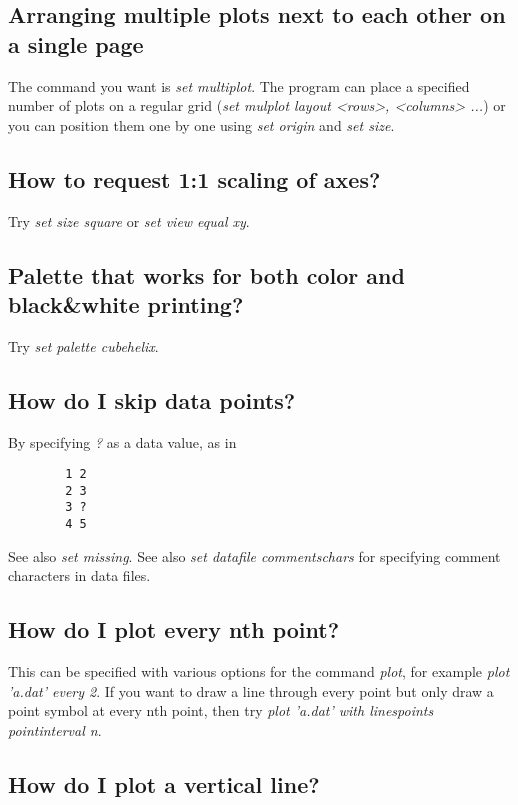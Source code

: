 \documentclass[letter,11pt]{article}
\begin{document}
{\subsection{Arranging multiple plots next to each other on a single page}

The command you want is {\em set multiplot}.  The program can place
a specified number of plots on a regular grid
({\em set mulplot layout <rows>, <columns> ...}) or you can position them
one by one using {\em set origin} and {\em set size}.

\subsection{How to request 1:1 scaling of axes?}

Try {\em set size square} or {\em set view equal xy}.

\subsection{Palette that works for both color and black\&white printing?}

Try {\em set palette cubehelix}.

\subsection{How do I skip data points?}

By specifying \textit{?} as a data value, as in
\small
\begin{verbatim}
        1 2
        2 3
        3 ?
        4 5
\end{verbatim}
\normalsize

See also \textit{set missing}.
See also \textit{set datafile commentschars} for specifying comment characters in
data files.


\subsection{How do I plot every nth point?}

This can be specified with various options for the command {\em plot},
for example {\em plot 'a.dat' every 2}.  If you want to draw a line
through every point but only draw a point symbol at every nth point,
then try {\em plot 'a.dat' with linespoints pointinterval n}.


\subsection{How do I plot a vertical line?}

}
\end{document}

